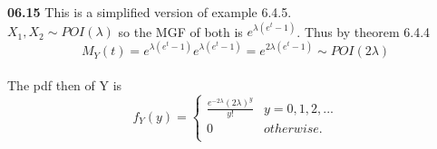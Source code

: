 {\bf 06.15} \quad This is a simplified version of example 6.4.5.
\\

$X_1, X_2 \sim POI(\lambda)$ so the MGF of both is $e^{\lambda(e^t - 1)}$. Thus by theorem 6.4.4 
\\

\[M_Y(t) = e^{\lambda(e^t - 1)}e^{\lambda(e^t - 1)} = e^{2\lambda(e^t - 1)} \sim POI(2\lambda)\]
\\
The pdf then of Y is 
$$
f_Y(y) = 
	\begin{cases}
		\frac{e^{-2\lambda}(2\lambda)^y}{y!} & y = 0, 1, 2, ... \\ 
		0 & otherwise. \\
	\end{cases}
$$


